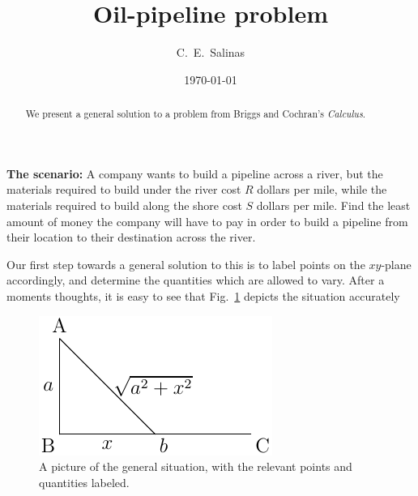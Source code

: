 \documentclass[12pt,letterpaper]{article}
\begin{document}
\title{Oil-pipeline problem}
\author{C.\ E.\ Salinas}
\date{\today}
\maketitle
\begin{abstract}
  We present a general solution to a problem from Briggs and Cochran's
  \emph{Calculus}. 
\end{abstract}

\textbf{The scenario:} A company wants to build a pipeline across a river, but
the materials required to build under the river cost $R$ dollars per mile, while
the materials required to build along the shore cost $S$ dollars per mile. Find
the least amount of money the company will have to pay in order to build a
pipeline from their location to their destination across the river.

Our first step towards a general solution to this is to label points on the
$xy$-plane accordingly, and determine the quantities which are allowed to vary.
After a moments thoughts, it is easy to see that Fig.\ \ref{fig:1} depicts the
situation accurately
\begin{figure}[htbp]
  \centering
  \includegraphics{figs/boat-problem}
  \caption{A picture of the general situation, with the relevant points and
    quantities labeled.}
  \label{fig:1}
\end{figure}
\end{document}
